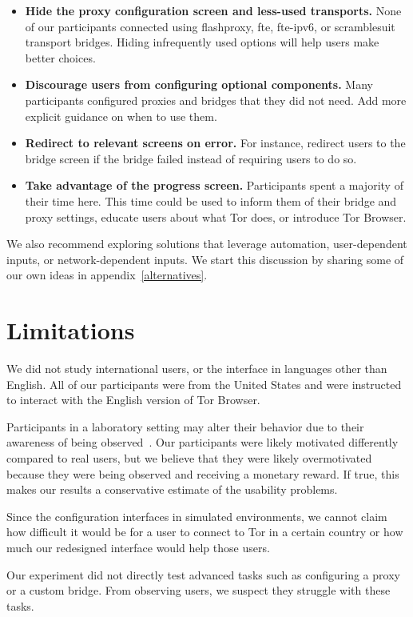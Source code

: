 \documentclass[USenglish,oneside,twocolumn]{article}
\begin{document}
\begin{itemize}
\item {\bfseries Hide the proxy configuration screen and less-used transports.} None of our participants connected using flashproxy, fte, fte-ipv6, or scramblesuit transport bridges. Hiding infrequently used options will help users make better choices.
\item {\bfseries Discourage users from configuring optional components.} Many participants configured proxies and bridges that they did not need. Add more explicit guidance on when to use them.
\item {\bfseries Redirect to relevant screens on error.} For instance, redirect users to the bridge screen if the bridge failed instead of requiring users to do so.
\item {\bfseries Take advantage of the progress screen.} Participants spent a majority of their time here. This time could be used to inform them of their bridge and proxy settings, educate users about what Tor does, or introduce Tor Browser.
\end{itemize}

We also recommend exploring solutions that leverage automation, user-dependent inputs, or network-dependent inputs. We start this discussion by sharing some of our own ideas in appendix~\ref{alternatives}. 

\section{Limitations}
\label{sec:limitations}
We did not study international users, or the interface in languages other than English. All of our participants were from the United States and were instructed to interact with the English version of Tor Browser.

Participants in a laboratory setting may alter their behavior due to their awareness of being observed~\cite{mccarney2007hawthorne}. Our participants were likely motivated differently compared to real users, but we believe that they were likely overmotivated because they were being observed and receiving a monetary reward. If true, this makes our results a conservative estimate of the usability problems. 

Since the configuration interfaces in simulated environments, we cannot claim how difficult it would be for a user to connect to Tor in a certain country or how much our redesigned interface would help those users.  

Our experiment did not directly test advanced tasks such as configuring a proxy or a custom bridge. From observing  users, we suspect they struggle with these tasks. 
\end{document}
